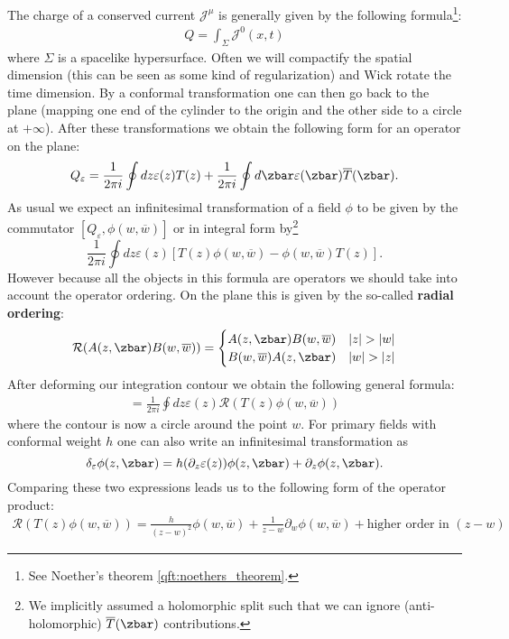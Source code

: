 	The charge of a conserved current $\mathcal{J}^\mu$ is generally given by the following formula\footnote{See Noether's theorem \ref{qft:noethers_theorem}.}:
	\begin{gather}
		Q = \int_\Sigma\mathcal{J}^0(x, t)
	\end{gather}
	where $\Sigma$ is a spacelike hypersurface. Often we will compactify the spatial dimension (this can be seen as some kind of regularization) and Wick rotate the time dimension. By a conformal transformation one can then go back to the plane (mapping one end of the cylinder to the origin and the other side to a circle at $+\infty$). After these transformations we obtain the following form for an operator on the plane:
	\begin{gather}
		Q_\varepsilon = \frac{1}{2\pi i}\oint dz\varepsilon(z)T(z) + \frac{1}{2\pi i}\oint d\zbar\varepsilon(\zbar)\overline{T}(\zbar).
	\end{gather}
	As usual we expect an infinitesimal transformation of a field $\phi$ to be given by the commutator $[Q_\varepsilon, \phi(w, \overline{w})]$ or in integral form by\footnote{We implicitly assumed a holomorphic split such that we can ignore (anti-holomorphic) $\overline{T}(\zbar)$ contributions.} \[\frac{1}{2\pi i}\oint dz\varepsilon(z)[T(z)\phi(w, \overline{w}) - \phi(w, \overline{w})T(z)].\] However because all the objects in this formula are operators we should take into account the operator ordering. On the plane this is given by the so-called \textbf{radial ordering}:
	\begin{gather}
		\mathcal{R}(A(z, \zbar)B(w, \overline{w})) = \begin{cases}
			A(z, \zbar)B(w, \overline{w})&|z|>|w|\\
			B(w, \overline{w})A(z, \zbar)&|w|>|z|
		\end{cases}
	\end{gather}
	After deforming our integration contour we obtain the following general formula:
	\begin{gather}
		[Q_\varepsilon, \phi(w, \overline{w})] = \frac{1}{2\pi i}\oint dz\varepsilon(z)\mathcal{R}(T(z)\phi(w, \overline{w}))
	\end{gather}
	where the contour is now a circle around the point $w$. For primary fields with conformal weight $h$ one can also write an infinitesimal transformation as \[\delta_\varepsilon\phi(z, \zbar) = h(\partial_z\varepsilon(z))\phi(z, \zbar) + \partial_z\phi(z, \zbar).\] Comparing these two expressions leads us to the following form of the operator product:
	\begin{gather}
		\mathcal{R}(T(z)\phi(w, \overline{w})) = \frac{h}{(z-w)^2}\phi(w, \overline{w}) + \frac{1}{z-w}\partial_w\phi(w, \overline{w}) + \text{higher order in } (z-w)
	\end{gather}

